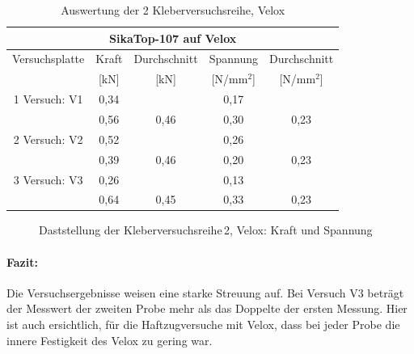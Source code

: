 \begin{table}
\caption{Auswertung der 2 Kleberversuchsreihe, Velox}
\begin{center}


\begin{tabular}{|c|c|c|c|c|} \hline
\multicolumn{5}{|c|}{SikaTop-107 auf Velox} \\\hline
Versuchsplatte & Kraft & Durchschnitt & Spannung & Durchschnitt \\
	& [kN] & [kN] & [N/mm$^{2}$] & [N/mm$^{2}$] \\
	\hline\hline
\cline{2-2} 1 Versuch: V1  & 0,34 & & 0,17&  \\\cline{2-2}&0,56 & 0,46 &0,30 &0,23
\\\hline\hline

\cline{2-2} 2 Versuch: V2  & 0,52 & & 0,26 &  \\\cline{2-2}&0,39 & 0,46 &0,20 & 0,23
\\\hline\hline

\cline{2-2} 3 Versuch: V3 & 0,26 & & 0,13 & \\\cline{2-2}&0,64 & 0,45 & 0,33 & 0,23  
\\\hline
\end{tabular}

\label{tab:2.2kleberversuche}

\end{center}
\end{table}

\begin{figure}
\begin{center}
\caption{Daststellung der Kleberversuchsreihe\,2, Velox: Kraft und Spannung}
\label{BT3}
\end{center}
\end{figure}

\paragraph{Fazit:}

Die Versuchsergebnisse weisen eine starke Streuung auf. Bei Versuch V3 beträgt der Messwert der zweiten Probe mehr als das Doppelte der ersten Messung. Hier ist auch ersichtlich, für die Haftzugversuche mit Velox, dass bei jeder Probe die innere Festigkeit des Velox zu gering war. 
